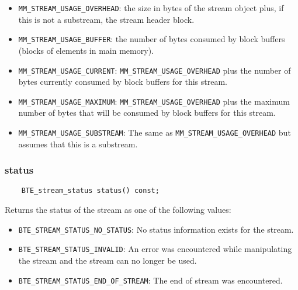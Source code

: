 \begin{itemize}
\item \lstinline|MM_STREAM_USAGE_OVERHEAD|: the size in bytes of the
  stream object plus, if this is not a substream, the stream header
  block.
\item \lstinline|MM_STREAM_USAGE_BUFFER|: the number of bytes consumed
  by block buffers (blocks of elements in main memory).
\item \lstinline|MM_STREAM_USAGE_CURRENT|:
  \lstinline|MM_STREAM_USAGE_OVERHEAD| plus the number of bytes
  currently consumed by block buffers for this stream.
\item \lstinline|MM_STREAM_USAGE_MAXIMUM|:
  \lstinline|MM_STREAM_USAGE_OVERHEAD| plus the maximum number of
  bytes that will be consumed by block buffers for this stream.
\item \lstinline|MM_STREAM_USAGE_SUBSTREAM|: The same as
  \lstinline|MM_STREAM_USAGE_OVERHEAD| but assumes that this is a
  substream.
\end{itemize}

\vspace*{\baselineskip}
\subsubsection{status}

\begin{lstlisting}
    BTE_stream_status status() const;
\end{lstlisting}

\noindent
Returns the status of the stream as one of the following
values:  

\begin{itemize}
\item \lstinline|BTE_STREAM_STATUS_NO_STATUS|: No status information
  exists for the stream.
\item \lstinline|BTE_STREAM_STATUS_INVALID|: An error was encountered
  while manipulating the stream and the stream can no longer be used.
\item \lstinline|BTE_STREAM_STATUS_END_OF_STREAM|: The end of stream
  was encountered.
\end{itemize}


